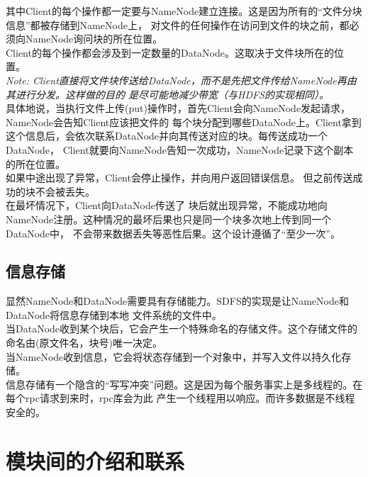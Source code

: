 \documentclass[a4paper]{article}
\begin{document}
其中Client的每个操作都一定要与NameNode建立连接。这是因为所有的``文件分块信息''都被存储到NameNode上，
对文件的任何操作在访问到文件的块之前，都必须向NameNode询问块的所在位置。\\

Client的每个操作都会涉及到一定数量的DataNode。这取决于文件块所在的位置。\\

\emph{Note: Client直接将文件块传送给DataNode，而不是先把文件传给NameNode再由其进行分发。这样做的目的
是尽可能地减少带宽（与HDFS的实现相同）。} \\

具体地说，当执行文件上传(put)操作时，首先Client会向NameNode发起请求，NameNode会告知Client应该把文件的
每个块分配到哪些DataNode上。Client拿到这个信息后，会依次联系DataNode并向其传送对应的块。每传送成功一个DataNode，
Client就要向NameNode告知一次成功，NameNode记录下这个副本的所在位置。\\

如果中途出现了异常，Client会停止操作，并向用户返回错误信息。
但之前传送成功的块不会被丢失。\\

在最坏情况下，Client向DataNode传送了
块后就出现异常，不能成功地向NameNode注册。这种情况的最坏后果也只是同一个块多次地上传到同一个DataNode中，
不会带来数据丢失等恶性后果。这个设计遵循了``至少一次''。

\subsection{信息存储}
显然NameNode和DataNode需要具有存储能力。SDFS的实现是让NameNode和DataNode将信息存储到本地
文件系统的文件中。\\

当DataNode收到某个块后，它会产生一个特殊命名的存储文件。这个存储文件的命名由(原文件名，块号)唯一决定。 \\

当NameNode收到信息，它会将状态存储到一个对象中，并写入文件以持久化存储。\\

信息存储有一个隐含的``写写冲突''问题。这是因为每个服务事实上是多线程的。在每个rpc请求到来时，rpc库会为此
产生一个线程用以响应。而许多数据是不线程安全的。

\section{模块间的介绍和联系}
\end{document}

